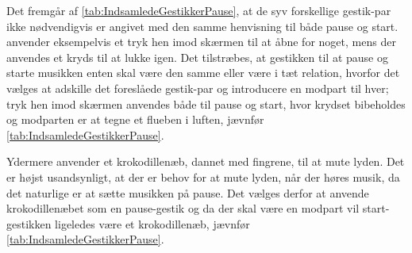 \noindent
%
Det fremgår af \autoref{tab:IndsamledeGestikkerPause}, at de syv forskellige gestik-par ikke nødvendigvis er angivet med den samme henvisning til både pause og start. \textcite[s. 48]{PDF:UserDefinedGesturesTV} anvender eksempelvis et tryk hen imod skærmen til at åbne for noget, mens der anvendes et kryds til at lukke igen. Det tilstræbes, at gestikken til at pause og starte musikken enten skal være den samme eller være i tæt relation, hvorfor det vælges at adskille det foreslåede gestik-par og introducere en modpart til hver; tryk hen imod skærmen anvendes både til pause og start, hvor krydset bibeholdes og modparten er at tegne et flueben i luften, jævnfør \autoref{tab:IndsamledeGestikkerPause}.   

Ydermere anvender \textcite[s. 48]{PDF:UserDefinedGesturesTV} et krokodillenæb, dannet med fingrene, til at mute lyden. Det er højst usandsynligt, at der er behov for at mute lyden, når der høres musik, da det naturlige er at sætte musikken på pause. Det vælges derfor at anvende krokodillenæbet som en pause-gestik og da der skal være en modpart vil start-gestikken ligeledes være et krokodillenæb, jævnfør \autoref{tab:IndsamledeGestikkerPause}. 
%
